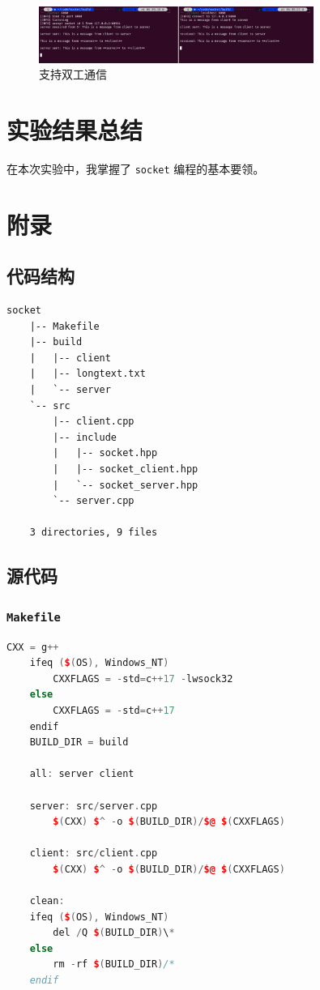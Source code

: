 \documentclass{article}
\begin{document}
\begin{figure}[H]
    \centering
    \includegraphics[width=0.8\textwidth]{img/9.png}
    \caption{支持双工通信}
\end{figure}

\section{实验结果总结}

在本次实验中，我掌握了 \texttt{socket} 编程的基本要领。

\section{附录}

\subsection{代码结构}

\begin{lstlisting}[numbers=none]
    socket
    |-- Makefile
    |-- build
    |   |-- client
    |   |-- longtext.txt
    |   `-- server
    `-- src
        |-- client.cpp
        |-- include
        |   |-- socket.hpp
        |   |-- socket_client.hpp
        |   `-- socket_server.hpp
        `-- server.cpp
    
    3 directories, 9 files
\end{lstlisting}

\subsection{源代码}

\subsubsection{\texttt{Makefile}}

\begin{lstlisting}[language=C++]
    CXX = g++
    ifeq ($(OS), Windows_NT)
        CXXFLAGS = -std=c++17 -lwsock32
    else
        CXXFLAGS = -std=c++17
    endif
    BUILD_DIR = build
    
    all: server client
    
    server: src/server.cpp
        $(CXX) $^ -o $(BUILD_DIR)/$@ $(CXXFLAGS)
    
    client: src/client.cpp
        $(CXX) $^ -o $(BUILD_DIR)/$@ $(CXXFLAGS)
    
    clean:
    ifeq ($(OS), Windows_NT)
        del /Q $(BUILD_DIR)\*
    else
        rm -rf $(BUILD_DIR)/*
    endif
\end{lstlisting}
\end{document}
